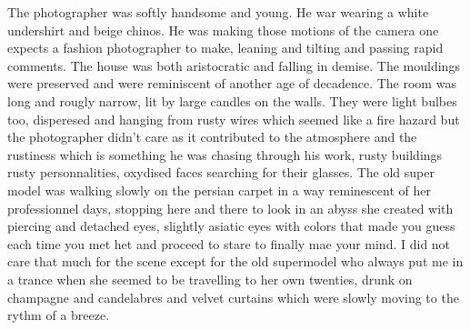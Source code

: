The
photographer was softly handsome and young. He war
wearing a white undershirt and beige chinos. He was making those motions of
the camera one expects a fashion photographer to make, leaning and tilting and
passing rapid comments.  The house was both aristocratic and falling in demise.
The mouldings were preserved and were reminiscent of another age of decadence.
The room was long and rougly narrow, lit by large candles on the walls. They
were light bulbes too, disperesed and hanging from rusty wires which seemed
like a fire hazard but the photographer didn’t care as it contributed to the
atmosphere and the rustiness which is something he was chasing through his
work, rusty buildings rusty personnalities, oxydised faces searching for their
glasses. The old super model was walking slowly on the persian carpet in a way
reminescent of  her professionnel days, stopping here and there to look in an
abyss she created with piercing and detached eyes, slightly asiatic eyes with
colors that made you guess each time you met het and proceed to stare to
finally mae your mind. I did not care that much for the scene except for the
old supermodel who always put me in a trance when she seemed to be travelling
to her own twenties, drunk on champagne and candelabres and velvet curtains
which were slowly moving to the rythm of a breeze.\\ 

